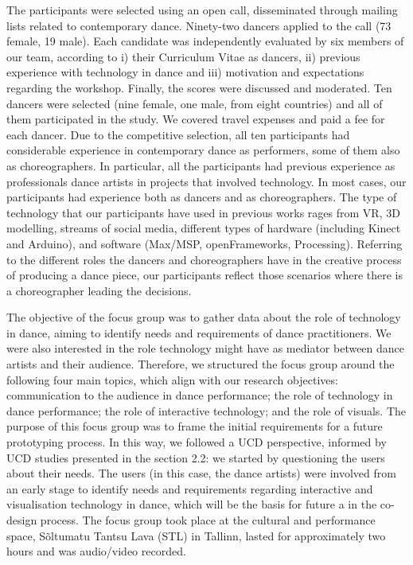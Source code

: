 The participants were selected using an open call, disseminated through mailing lists related to contemporary dance. Ninety-two dancers applied to the call (73 female, 19 male). Each candidate was independently evaluated by six members of our team, according to i) their Curriculum Vitae as dancers, ii) previous experience with technology in dance and iii) motivation and expectations regarding the workshop. Finally, the scores were discussed and moderated. Ten dancers were selected (nine female, one male, from eight countries) and all of them participated in the study. We covered travel expenses and paid a fee for each dancer. Due to the competitive selection, all ten participants had considerable experience in contemporary dance as performers, some of them also as choreographers.
In particular, all the participants had previous experience as professionals dance artists in projects that involved technology. In most cases, our participants had experience both as dancers and as choreographers. The type of technology that our participants have used in previous works rages from VR, 3D modelling, streams of social media, different types of hardware (including Kinect and Arduino), and software (Max/MSP, openFrameworks, Processing). Referring to the different roles the dancers and choreographers have in the creative process of producing a dance piece, our participants reflect those scenarios where there is a choreographer leading the decisions.

The objective of the focus group was to gather data about the role of technology in dance, aiming to identify needs and requirements of dance practitioners. We were also interested in the role technology might have as mediator between dance artists and their audience. Therefore, we structured the focus group around the following four main topics, which align with our research objectives: communication to the audience in dance performance; the role of technology in dance performance; the role of interactive technology; and the role of visuals. The purpose of this focus group was to frame the initial requirements for a future prototyping process. In this way, we followed a UCD perspective, informed by UCD studies presented in the section 2.2: we started by questioning the users about their needs.
The users (in this case, the dance artists) were involved from an early stage to identify needs and requirements regarding interactive and visualisation technology in dance, which will be the basis for future a in the co-design process. The focus group took place at the cultural and performance space, Sõltumatu Tantsu Lava (STL) in Tallinn, lasted for approximately two hours and was audio/video recorded.

